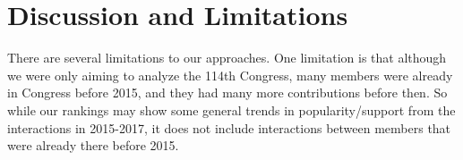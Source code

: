 \documentclass[11pt]{article}
\begin{document}







\section*{Discussion and Limitations}
There are several limitations to our approaches. One limitation is that although we were only aiming to analyze the 114th Congress, many members were already in Congress before 2015, and they had many more contributions before then. So while our rankings may show some general trends in popularity/support from the interactions in 2015-2017, it does not include interactions between members that were already there before 2015. 






\end{document}

